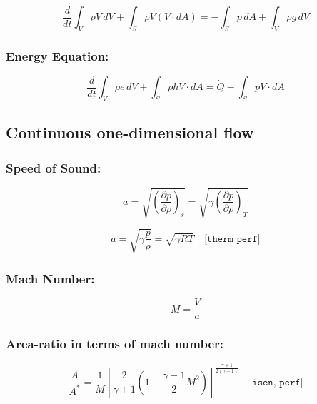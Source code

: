 \begin{equation}
	\frac{d}{dt} \int_V \rho V \, dV + \int_S \rho V (V \cdot dA) = - \int_S p \, dA + \int_V \rho g \, dV
\end{equation}

\subsubsection*{Energy Equation:}

\begin{equation}
	\frac{d}{dt} \int_V \rho e \, dV + \int_S \rho h V \cdot dA = \dot{Q} - \int_S p V \cdot dA
\end{equation}

\subsection*{Continuous one-dimensional flow}

\subsubsection*{Speed of Sound:}

\begin{equation}
	a = \sqrt{\left( \frac{\partial p}{\partial \rho} \right)_s} = \sqrt{\gamma \left( \frac{\partial p}{\partial \rho} \right)_T}
\end{equation}

\begin{equation}
	a = \sqrt{\gamma \frac{p}{\rho}} = \sqrt{\gamma RT} \quad \texttt{[therm perf]}
\end{equation}

\subsubsection*{Mach Number:}

\begin{equation}
	M = \frac{V}{a}
\end{equation}

\subsubsection*{Area-ratio in terms of mach number:}
\begin{equation}
	\frac{A}{A^*} = \frac{1}{M} \left[ \frac{2}{\gamma + 1} \left( 1 + \frac{\gamma - 1}{2} M^2 \right) \right]^{\frac{\gamma + 1}{2(\gamma - 1)}}
	\quad \texttt{[isen, perf]}     
	\label{eq:area_ratio_mach}
\end{equation}
